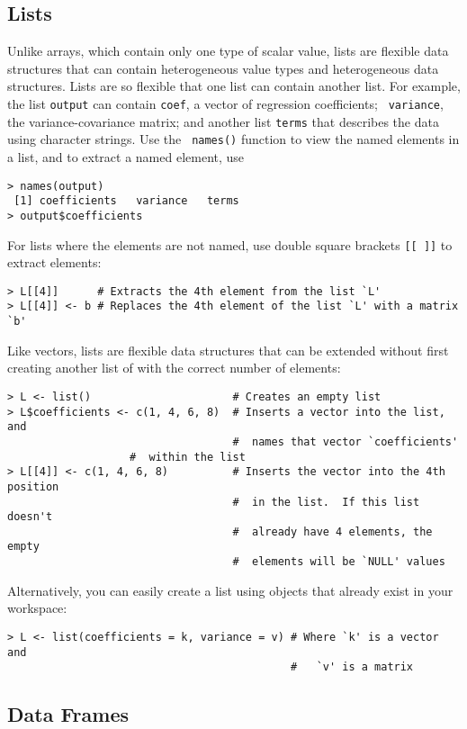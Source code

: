 \subsection{Lists}

Unlike arrays, which contain only one type of scalar value, lists
are flexible data structures that can contain heterogeneous value types
and heterogeneous data structures.  Lists are so flexible that one list
can contain another list.  For example, the list {\tt output} can
contain {\tt coef}, a vector of regression coefficients; {\tt
variance}, the variance-covariance matrix; and another list {\tt terms}
that describes the data using character strings.  Use the {\tt
names()} function to view the named elements in a list, and to extract
a named element, use
\begin{verbatim}
> names(output)
 [1] coefficients   variance   terms
> output$coefficients
\end{verbatim} %
For lists where the elements are not named, use double square brackets
\verb|[[ ]]| to extract elements:  
\begin{verbatim}
> L[[4]]      # Extracts the 4th element from the list `L'
> L[[4]] <- b # Replaces the 4th element of the list `L' with a matrix `b'
\end{verbatim}

Like vectors, lists are flexible data structures that can be extended
without first creating another list of with the correct number of
elements:  
\begin{verbatim}
> L <- list()                      # Creates an empty list
> L$coefficients <- c(1, 4, 6, 8)  # Inserts a vector into the list, and 
                                   #  names that vector `coefficients' 
				   #  within the list
> L[[4]] <- c(1, 4, 6, 8)          # Inserts the vector into the 4th position
                                   #  in the list.  If this list doesn't 
                                   #  already have 4 elements, the empty 
                                   #  elements will be `NULL' values
\end{verbatim} %
Alternatively, you can easily create a list using objects that already
exist in your workspace:  
\begin{verbatim}
> L <- list(coefficients = k, variance = v) # Where `k' is a vector and
                                            #   `v' is a matrix
\end{verbatim}

\subsection{Data Frames}


